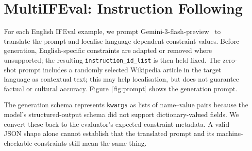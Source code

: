 \documentclass[11pt]{article}
\begin{document}
\section{MultiIFEval: Instruction Following}
\label{sec:dataset-generation}

For each English IFEval example, we prompt
Gemini-3-flash-preview~\cite{google-ai2026gemini-3-flash-preview} to translate the
prompt and localise language-dependent constraint values. Before generation,
English-specific constraints are adapted or removed where unsupported; the
resulting \texttt{instruction\_id\_list} is then held fixed. The zero-shot
prompt includes
a randomly selected Wikipedia article in the target language as contextual text;
this may help localisation, but does not guarantee factual or cultural accuracy.
Figure~\ref{fig:prompt} shows the generation prompt.

The generation schema represents \texttt{kwargs} as lists of name--value pairs
because the model's structured-output schema did not support dictionary-valued
fields. We convert these back to the evaluator's expected constraint metadata.
A valid JSON shape alone cannot establish that the translated prompt and its
machine-checkable constraints still mean the same thing.
\end{document}
